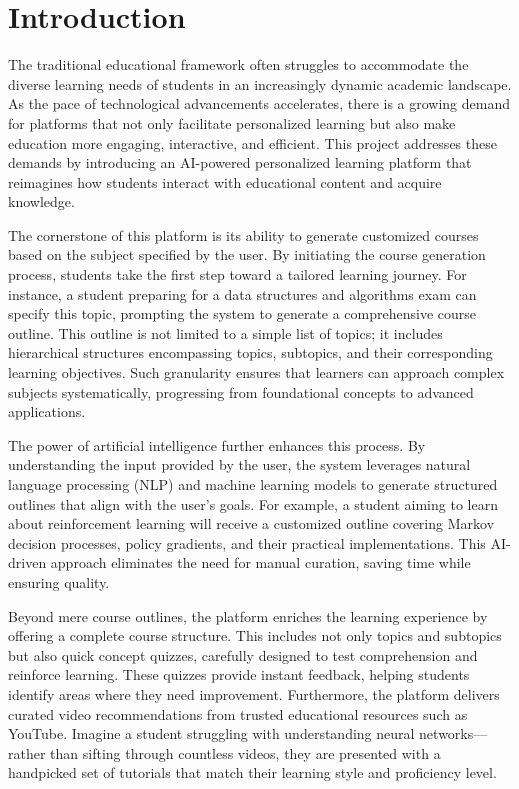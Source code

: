 \chapter{Introduction} 

\label{Chapter1}
The traditional educational framework often struggles to accommodate the diverse learning needs of students in an increasingly dynamic academic landscape. As the pace of technological advancements accelerates, there is a growing demand for platforms that not only facilitate personalized learning but also make education more engaging, interactive, and efficient. This project addresses these demands by introducing an AI-powered personalized learning platform that reimagines how students interact with educational content and acquire knowledge.

The cornerstone of this platform is its ability to generate customized courses based on the subject specified by the user. By initiating the course generation process, students take the first step toward a tailored learning journey. For instance, a student preparing for a data structures and algorithms exam can specify this topic, prompting the system to generate a comprehensive course outline. This outline is not limited to a simple list of topics; it includes hierarchical structures encompassing topics, subtopics, and their corresponding learning objectives. Such granularity ensures that learners can approach complex subjects systematically, progressing from foundational concepts to advanced applications.

The power of artificial intelligence further enhances this process. By understanding the input provided by the user, the system leverages natural language processing (NLP) and machine learning models to generate structured outlines that align with the user’s goals. For example, a student aiming to learn about reinforcement learning will receive a customized outline covering Markov decision processes, policy gradients, and their practical implementations. This AI-driven approach eliminates the need for manual curation, saving time while ensuring quality.

Beyond mere course outlines, the platform enriches the learning experience by offering a complete course structure. This includes not only topics and subtopics but also quick concept quizzes, carefully designed to test comprehension and reinforce learning. These quizzes provide instant feedback, helping students identify areas where they need improvement. Furthermore, the platform delivers curated video recommendations from trusted educational resources such as YouTube. Imagine a student struggling with understanding neural networks—rather than sifting through countless videos, they are presented with a handpicked set of tutorials that match their learning style and proficiency level.

